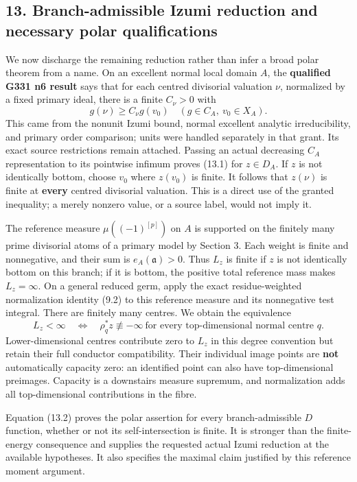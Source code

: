 \documentclass[
]{article}
\begin{document}
\subsection{13. Branch-admissible Izumi reduction and necessary polar
qualifications}\label{branch-admissible-izumi-reduction-and-necessary-polar-qualifications}

We now discharge the remaining reduction rather than infer a broad polar
theorem from a name. On an excellent normal local domain \(A\), the
\textbf{qualified G331 n6 result} says that for each centred divisorial
valuation \(\nu\), normalized by a fixed primary ideal, there is a
finite \(C_\nu>0\) with
\[g(\nu)\ge C_\nu g(v_0)\quad(g\in C_A,\ v_0\in X_A).\tag{13.1}\] This
came from the nonunit Izumi bound, normal excellent analytic
irreducibility, and primary order comparison; units were handled
separately in that grant. Its exact source restrictions remain attached.
Passing an actual decreasing \(C_A\) representation to its pointwise
infimum proves (13.1) for \(z\in D_A\). If \(z\) is not identically
bottom, choose \(v_0\) where \(z(v_0)\) is finite. It follows that
\(z(\nu)\) is finite at \textbf{every} centred divisorial valuation.
This is a direct use of the granted inequality; a merely nonzero value,
or a source label, would not imply it.

The reference measure \(\mu((-1)^{[p]})\) on \(A\) is supported on the
finitely many prime divisorial atoms of a primary model by Section 3.
Each weight is finite and nonnegative, and their sum is
\(e_A(\mathfrak a)>0\). Thus \(L_z\) is finite if \(z\) is not
identically bottom on this branch; if it is bottom, the positive total
reference mass makes \(L_z=\infty\). On a general reduced germ, apply
the exact residue-weighted normalization identity (9.2) to this
reference measure and its nonnegative test integral. There are finitely
many centres. We obtain the equivalence
\[L_z<\infty\quad\Longleftrightarrow\quad
\rho_q^*z\not\equiv-\infty\ \text{for every top-dimensional normal centre }q.\tag{13.2}\]
Lower-dimensional centres contribute zero to \(L_z\) in this degree
convention but retain their full conductor compatibility. Their
individual image points are \textbf{not} automatically capacity zero: an
identified point can also have top-dimensional preimages. Capacity is a
downstairs measure supremum, and normalization adds all top-dimensional
contributions in the fibre.

Equation (13.2) proves the polar assertion for every branch-admissible
\(D\) function, whether or not its self-intersection is finite. It is
stronger than the finite-energy consequence and supplies the requested
actual Izumi reduction at the available hypotheses. It also specifies
the maximal claim justified by this reference moment argument.
\end{document}
